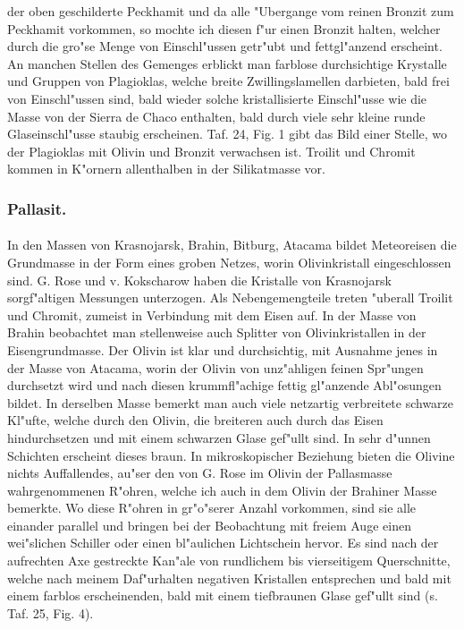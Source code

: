 \documentclass[a4paper, 11pt, oneside, polutonikogreek, german]{article}
\begin{document}
der oben geschilderte Peckhamit und da alle "Ubergange vom reinen Bronzit zum Peckhamit vorkommen, so mochte ich diesen f"ur einen Bronzit halten, welcher durch die gro"se Menge von Einschl"ussen getr"ubt und fettgl"anzend erscheint. An manchen Stellen des Gemenges erblickt man farblose durchsichtige Krystalle und Gruppen von Plagioklas, welche breite Zwillingslamellen darbieten, bald frei von Einschl"ussen sind, bald wieder solche kristallisierte Einschl"usse wie die Masse von der Sierra de Chaco enthalten, bald durch viele sehr kleine runde Glaseinschl"usse staubig erscheinen. Taf. 24, Fig. 1 gibt das Bild einer Stelle, wo der Plagioklas mit Olivin und Bronzit verwachsen ist. Troilit und Chromit kommen in K"ornern allenthalben in der Silikatmasse vor.

\subsubsection{Pallasit.}
\paragraph{}
In den Massen von Krasnojarsk, Brahin, Bitburg, Atacama bildet Meteoreisen die Grundmasse in der Form eines groben Netzes, worin Olivinkristall eingeschlossen sind. G. Rose und v. Kokscharow haben die Kristalle von Krasnojarsk sorgf"altigen Messungen unterzogen. Als Nebengemengteile treten "uberall Troilit und Chromit, zumeist in Verbindung mit dem Eisen auf. In der Masse von Brahin beobachtet man stellenweise auch Splitter von Olivinkristallen in der Eisengrundmasse. Der Olivin ist klar und durchsichtig, mit Ausnahme jenes in der Masse von Atacama, worin der Olivin von unz"ahligen feinen Spr"ungen durchsetzt wird und nach diesen krummfl"achige fettig gl"anzende Abl"osungen bildet. In derselben Masse bemerkt man auch viele netzartig verbreitete schwarze Kl"ufte, welche durch den Olivin, die breiteren auch durch das Eisen hindurchsetzen und mit einem schwarzen Glase gef"ullt sind. In sehr d"unnen Schichten erscheint dieses braun. In mikroskopischer Beziehung bieten die Olivine nichts Auffallendes, au"ser den von G. Rose im Olivin der Pallasmasse wahrgenommenen R"ohren, welche ich auch in dem Olivin der Brahiner Masse bemerkte. Wo diese R"ohren in gr"o"serer Anzahl vorkommen, sind sie alle einander parallel und bringen bei der Beobachtung mit freiem Auge einen wei"slichen Schiller oder einen bl"aulichen Lichtschein hervor. Es sind nach der aufrechten Axe gestreckte Kan"ale von rundlichem bis vierseitigem Querschnitte, welche nach meinem Daf"urhalten negativen Kristallen entsprechen und bald mit einem farblos erscheinenden, bald mit einem tiefbraunen Glase gef"ullt sind (s. Taf. 25, Fig. 4).
\clearpage
\end{document}
